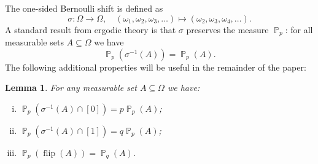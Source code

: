 \documentclass[a4paper,12pt]{article}
\newtheorem{lemma}{Lemma}[section]
\DeclareMathOperator{\prob}{\mathbb{P}}
\DeclareMathOperator{\rec}{flip}
\begin{document}
The one-sided Bernoulli shift is defined as
\[
\sigma : \Omega \to \Omega, \quad (\omega_1,\omega_2,\omega_3,\dots) \mapsto (\omega_2,\omega_3,\omega_4,\dots).
\]
A standard result from ergodic theory \cite{Berger:2001, DajaniKalle:2021} is that $\sigma$ preserves the measure $\prob_p$: for all measurable sets $A \subseteq \Omega$ we have
\[
\prob_p(\sigma^{-1}(A)) = \prob_p(A).
\]
The following additional properties will be useful in the remainder of the paper:

\begin{lemma}
\label{lemma:sigma1}
For any measurable set $A \subseteq \Omega$ we have:
\begin{enumerate}[(i)]
\item $\prob_p(\sigma^{-1}(A) \cap [0]) = p\prob_p(A)$; 
\item $\prob_p(\sigma^{-1}(A) \cap [1]) = q\prob_p(A)$;
\item $\prob_p(\rec(A)) = \prob_q(A)$.
\end{enumerate}
\end{lemma}
\end{document}
